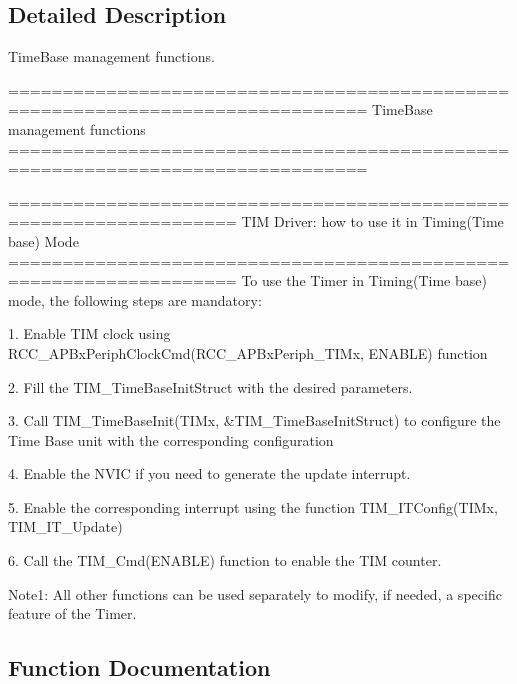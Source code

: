 \subsection{Detailed Description}
Time\+Base management functions. 

\begin{DoxyVerb} ===============================================================================
                       TimeBase management functions
 ===============================================================================  
  
       ===================================================================      
              TIM Driver: how to use it in Timing(Time base) Mode
       =================================================================== 
       To use the Timer in Timing(Time base) mode, the following steps are mandatory:
       
       1. Enable TIM clock using RCC_APBxPeriphClockCmd(RCC_APBxPeriph_TIMx, ENABLE) function
                    
       2. Fill the TIM_TimeBaseInitStruct with the desired parameters.
       
       3. Call TIM_TimeBaseInit(TIMx, &TIM_TimeBaseInitStruct) to configure the Time Base unit
          with the corresponding configuration
          
       4. Enable the NVIC if you need to generate the update interrupt. 
          
       5. Enable the corresponding interrupt using the function TIM_ITConfig(TIMx, TIM_IT_Update) 
       
       6. Call the TIM_Cmd(ENABLE) function to enable the TIM counter.
             
       Note1: All other functions can be used separately to modify, if needed,
          a specific feature of the Timer. \end{DoxyVerb}
 

\subsection{Function Documentation}

